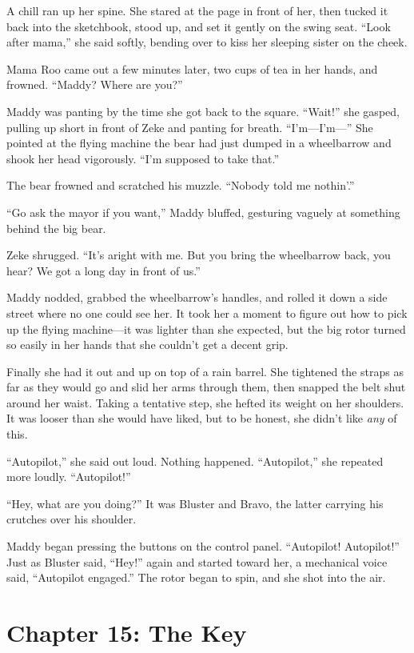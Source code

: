 \documentclass[10pt]{article}
\begin{document}
A chill ran up her spine. She stared at the page in front of her, then
tucked it back into the sketchbook, stood up, and set it gently on the
swing seat. ``Look after mama,'' she said softly, bending over to kiss
her sleeping sister on the cheek.

Mama Roo came out a few minutes later, two cups of tea in her hands, and
frowned. ``Maddy? Where are you?''

Maddy was panting by the time she got back to the square. ``Wait!'' she
gasped, pulling up short in front of Zeke and panting for breath.
``I'm---I'm---'' She pointed at the flying machine the bear had just
dumped in a wheelbarrow and shook her head vigorously. ``I'm supposed to
take that.''

The bear frowned and scratched his muzzle. ``Nobody told me nothin'.''

``Go ask the mayor if you want,'' Maddy bluffed, gesturing vaguely at
something behind the big bear.

Zeke shrugged. ``It's aright with me. But you bring the wheelbarrow
back, you hear? We got a long day in front of us.''

Maddy nodded, grabbed the wheelbarrow's handles, and rolled it down a
side street where no one could see her. It took her a moment to figure
out how to pick up the flying machine---it was lighter than she
expected, but the big rotor turned so easily in her hands that she
couldn't get a decent grip.

Finally she had it out and up on top of a rain barrel. She tightened the
straps as far as they would go and slid her arms through them, then
snapped the belt shut around her waist. Taking a tentative step, she
hefted its weight on her shoulders. It was looser than she would have
liked, but to be honest, she didn't like \emph{any} of this.

``Autopilot,'' she said out loud. Nothing happened. ``Autopilot,'' she
repeated more loudly. ``Autopilot!''

``Hey, what are you doing?'' It was Bluster and Bravo, the latter
carrying his crutches over his shoulder.

Maddy began pressing the buttons on the control panel. ``Autopilot!
Autopilot!'' Just as Bluster said, ``Hey!'' again and started toward
her, a mechanical voice said, ``Autopilot engaged.'' The rotor began to
spin, and she shot into the air.

\newpage
\section{Chapter 15: The Key}
\end{document}
